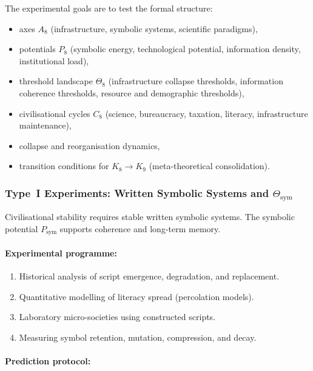 The experimental goals are to test the formal structure:

\begin{itemize}
    \item axes $A_8$ (infrastructure, symbolic systems, scientific paradigms),
    \item potentials $P_8$ (symbolic energy, technological potential,
          information density, institutional load),
    \item threshold landscape $\Theta_8$ (infrastructure collapse thresholds,
          information coherence thresholds, resource and demographic thresholds),
    \item civilisational cycles $C_8$ (science, bureaucracy, taxation,
          literacy, infrastructure maintenance),
    \item collapse and reorganisation dynamics,
    \item transition conditions for $K_8 \to K_9$ (meta-theoretical consolidation).
\end{itemize}



\subsubsection{Type~I Experiments: Written Symbolic Systems and $\Theta_{\mathrm{sym}}$}

Civilisational stability requires stable written symbolic systems.
The symbolic potential $P_{\mathrm{sym}}$ supports coherence and long-term memory.

\paragraph{Experimental programme:}

\begin{enumerate}
    \item Historical analysis of script emergence, degradation, and replacement.
    \item Quantitative modelling of literacy spread (percolation models).
    \item Laboratory micro-societies using constructed scripts.
    \item Measuring symbol retention, mutation, compression, and decay.
\end{enumerate}

\paragraph{Prediction protocol:}

